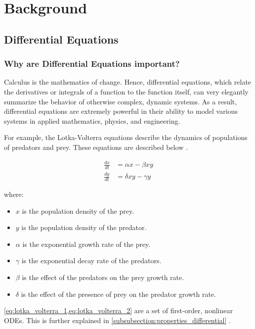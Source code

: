 \section{Background}
\label{section:background}
\subsection{Differential Equations}
\subsubsection{Why are Differential Equations important?}
Calculus is the mathematics of change. Hence, differential equations, which relate the derivatives or integrals of a function to the function itself, can very elegantly summarize the behavior of otherwise complex, dynamic systems. As a result, differential equations are extremely powerful in their ability to model various systems in applied mathematics, physics, and engineering.

For example, the Lotka-Volterra equations describe the dynamics of populations of predators and prey. These equations are described below \citep{wangersky1978lotka}.

\begin{align}
    \frac{dx}{dt} &= \alpha x - \beta x y \label{eq:lotka_volterra_1} \\
    \frac{dy}{dt} &= \delta x y - \gamma y \label{eq:lotka_volterra_2}
\end{align}

\noindent
where:
\begin{itemize}
    \item $x$ is the population density of the prey.
    \item $y$ is the population density of the predator.
    \item $\alpha$ is the exponential growth rate of the prey.
    \item $\gamma$ is the exponential decay rate of the predators.
    \item $\beta$ is the effect of the predators on the prey growth rate.
    \item $\delta$ is the effect of the presence of prey on the predator growth rate.
\end{itemize}

\noindent
\cref{eq:lotka_volterra_1,eq:lotka_volterra_2} are a set of first-order, nonlinear ODEs. This is further explained in \cref{subsubsection:properties_differential} .

